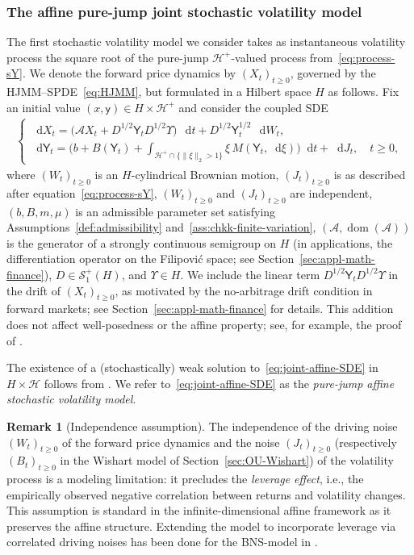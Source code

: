 \documentclass[10pt,a4paper,reqno]{amsart}
\DeclareMathOperator\dom{dom}
\newcommand*\D{\mathop{}\!\mathrm{d}}
\numberwithin{equation}{section}
\theoremstyle{plain}
\theoremstyle{definition}
\newtheorem{remark}[theorem]{Remark}
\theoremstyle{example}
\newcommand{\cA}{\mathcal{A}}
\newcommand{\cH}{\mathcal{H}}
\newcommand{\cS}{\mathcal{S}}
\newcommand{\sY}{\mathsf{Y}}
\newcommand{\cHplus}{\cH^{+}}
\begin{document}
\subsubsection{The affine pure-jump joint stochastic volatility model} 
The first stochastic volatility model we consider takes as instantaneous volatility process the square root of the pure-jump $\cH^+$-valued process from~\eqref{eq:process-sY}. We denote the forward price dynamics by $(X_t)_{t\geq 0}$, governed by the HJMM--SPDE~\eqref{eq:HJMM}, but formulated in a Hilbert space $H$ as follows. Fix an initial value $(x,\mathsf{y})\in H \times \cH^+$ and consider the coupled SDE
\begin{align}\label{eq:joint-affine-SDE}
  \begin{cases}
    \D X_{t} = \big( \cA X_{t} + D^{1/2}\sY_t D^{1/2}\Upsilon \big) \,\D t + D^{1/2}\sY_{t}^{1/2}\,\D W_{t}, \\
    \D \sY_{t} = \Big( b + B(\sY_{t}) + \int_{\cHplus \cap \{\|\xi\|_2 > 1\}} \xi \,M(\sY_t,\D\xi) \Big) \D t + \D J_{t}, \quad t \geq 0 ,
  \end{cases}
\end{align}
where $(W_t)_{t\geq 0}$ is an $H$-cylindrical Brownian motion, $(J_t)_{t\geq 0}$ is as described after equation~\eqref{eq:process-sY}, $(W_t)_{t\geq 0}$ and $(J_t)_{t\geq 0}$ are independent, $(b,B,m,\mu)$ is an admissible parameter set satisfying Assumptions~\ref{def:admissibility} and~\ref{ass:chkk-finite-variation}, $(\cA,\dom(\cA))$ is the generator of a strongly continuous semigroup on $H$ (in applications, the differentiation operator on the Filipovi\'{c} space; see Section~\ref{sec:appl-math-finance}), $D \in \cS_1^+(H)$, and $\Upsilon \in H$. We include the linear term $D^{1/2}\mathsf{Y}_t D^{1/2}\Upsilon$ in the drift of $(X_t)_{t\geq0}$, as motivated by the no-arbitrage drift condition in forward markets;
see Section~\ref{sec:appl-math-finance} for details. This addition does not affect well-posedness or the affine property; see, for example, the proof of \cite[Lemma~2.8]{CKK22b}.


The existence of a (stochastically) weak solution to~\eqref{eq:joint-affine-SDE} in $H \times \cH$ follows from \cite[Proposition~2.6 and Lemma~2.8]{CKK22b}. 
We refer to~\eqref{eq:joint-affine-SDE} as the \emph{pure-jump affine stochastic volatility model}.

\begin{remark}[Independence assumption]\label{rem:independence}
The independence of the driving noise $(W_t)_{t\geq 0}$ of the forward price dynamics and the noise $(J_t)_{t\geq 0}$ (respectively $(B_t)_{t\geq 0}$ in the Wishart model of Section~\ref{sec:OU-Wishart}) of the volatility process is a modeling limitation: it precludes the \emph{leverage effect}, i.e., the empirically observed negative correlation between returns and volatility changes. This assumption is standard in the infinite-dimensional affine framework as it preserves the affine structure. Extending the model to incorporate leverage via correlated driving noises has been done for the BNS-model in \cite{zbMATH07927020}.
\end{remark}
\end{document}
